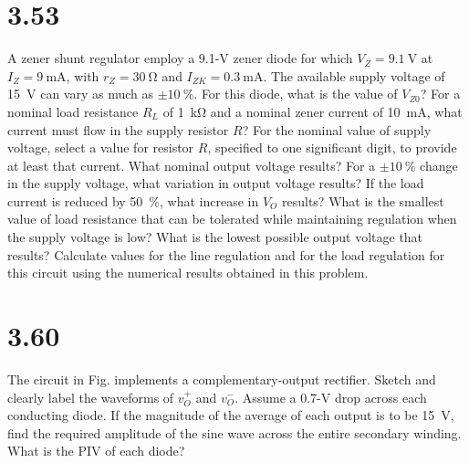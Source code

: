 \documentclass[12pt, a4paper]{article}
\newcommand{\sima}{\milli\ampere}
\newcommand{\siko}{\kilo\ohm}
\newcommand{\siv}{\volt}
\theoremstyle{mystyle}	%
\begin{document}
\section{3.53}
A zener shunt regulator employ a 9.1-\si{\siv} zener diode for which
$V_Z = \SI{9.1}{\siv}$ at $I_Z = \SI{9}{\sima}$, with $r_Z = \SI{30}{\ohm}$
and $I_{ZK}=\SI{0.3}{\sima}$. The available supply voltage of \SI{15}{\siv}
can vary as much as $\pm\SI{10}{\percent}$. For this diode, what is the
value of $V_{Z0}$? For a nominal load resistance $R_L$ of \SI{1}{\siko}
and a nominal zener current of \SI{10}{\sima}, what current must flow
in the supply resistor $R$? For the nominal value of supply voltage,
select a value for resistor $R$, specified to one significant digit,
to provide at least that current. What nominal output voltage results?
For a $\pm\SI{10}{\percent}$ change in the supply voltage, what variation
in output voltage results? If the load current is reduced by
\SI{50}{\percent}, what increase in $V_O$ results? What is the smallest
value of load resistance that can be tolerated while maintaining
regulation when the supply voltage is low? What is the lowest possible
output voltage that results? Calculate values for the line regulation
and for the load regulation for this circuit using the numerical results
obtained in this problem.

\section{3.60}
The circuit in Fig. implements a complementary-output rectifier.
Sketch and clearly label the waveforms of $v_O^+$ and $v_O^-$.
Assume a 0.7-\si{\siv} drop across each conducting diode. If the
magnitude of the average of each output is to be \SI{15}{\siv}, find
the required amplitude of the sine wave across the entire secondary
winding. What is the PIV of each diode?

% 
\end{document}
